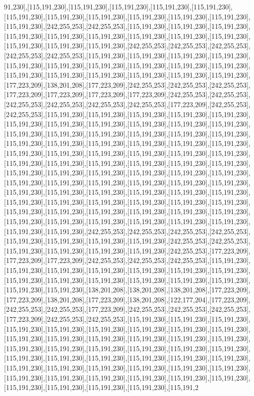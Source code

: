 91,230],[115,191,230],[115,191,230],[115,191,230],[115,191,230],[115,191,230],[115,191,230],[115,191,230],[115,191,230],[115,191,230],[115,191,230],[115,191,230],[115,191,230],[242,255,253],[242,255,253],[115,191,230],[115,191,230],[115,191,230],[115,191,230],[115,191,230],[115,191,230],[115,191,230],[115,191,230],[115,191,230],[115,191,230],[115,191,230],[115,191,230],[242,255,253],[242,255,253],[242,255,253],[242,255,253],[242,255,253],[115,191,230],[115,191,230],[115,191,230],[115,191,230],[115,191,230],[115,191,230],[115,191,230],[115,191,230],[115,191,230],[115,191,230],[115,191,230],[115,191,230],[115,191,230],[115,191,230],[115,191,230],[115,191,230],[177,223,209],[138,201,208],[177,223,209],[242,255,253],[242,255,253],[242,255,253],[177,223,209],[177,223,209],[177,223,209],[177,223,209],[242,255,253],[242,255,253],[242,255,253],[242,255,253],[242,255,253],[242,255,253],[177,223,209],[242,255,253],[242,255,253],[115,191,230],[115,191,230],[115,191,230],[115,191,230],[115,191,230],[115,191,230],[115,191,230],[115,191,230],[115,191,230],[115,191,230],[115,191,230],[115,191,230],[115,191,230],[115,191,230],[115,191,230],[115,191,230],[115,191,230],[115,191,230],[115,191,230],[115,191,230],[115,191,230],[115,191,230],[115,191,230],[115,191,230],[115,191,230],[115,191,230],[115,191,230],[115,191,230],[115,191,230],[115,191,230],[115,191,230],[115,191,230],[115,191,230],[115,191,230],[115,191,230],[115,191,230],[115,191,230],[115,191,230],[115,191,230],[115,191,230],[115,191,230],[115,191,230],[115,191,230],[115,191,230],[115,191,230],[115,191,230],[115,191,230],[115,191,230],[115,191,230],[115,191,230],[115,191,230],[115,191,230],[115,191,230],[115,191,230],[115,191,230],[115,191,230],[115,191,230],[115,191,230],[115,191,230],[115,191,230],[115,191,230],[115,191,230],[115,191,230],[115,191,230],[115,191,230],[115,191,230],[115,191,230],[115,191,230],[115,191,230],[115,191,230],[115,191,230],[115,191,230],[115,191,230],[242,255,253],[242,255,253],[242,255,253],[242,255,253],[115,191,230],[115,191,230],[115,191,230],[115,191,230],[242,255,253],[242,255,253],[115,191,230],[115,191,230],[115,191,230],[115,191,230],[242,255,253],[177,223,209],[177,223,209],[177,223,209],[242,255,253],[242,255,253],[242,255,253],[115,191,230],[115,191,230],[115,191,230],[115,191,230],[115,191,230],[115,191,230],[115,191,230],[115,191,230],[115,191,230],[115,191,230],[115,191,230],[115,191,230],[115,191,230],[115,191,230],[115,191,230],[138,201,208],[138,201,208],[138,201,208],[177,223,209],[177,223,209],[138,201,208],[177,223,209],[138,201,208],[122,177,204],[177,223,209],[242,255,253],[242,255,253],[177,223,209],[242,255,253],[242,255,253],[242,255,253],[177,223,209],[242,255,253],[242,255,253],[115,191,230],[115,191,230],[115,191,230],[115,191,230],[115,191,230],[115,191,230],[115,191,230],[115,191,230],[115,191,230],[115,191,230],[115,191,230],[115,191,230],[115,191,230],[115,191,230],[115,191,230],[115,191,230],[115,191,230],[115,191,230],[115,191,230],[115,191,230],[115,191,230],[115,191,230],[115,191,230],[115,191,230],[115,191,230],[115,191,230],[115,191,230],[115,191,230],[115,191,230],[115,191,230],[115,191,230],[115,191,230],[115,191,230],[115,191,230],[115,191,230],[115,191,230],[115,191,230],[115,191,230],[115,191,230],[115,191,230],[115,191,230],[115,191,230],[115,191,230],[115,191,2